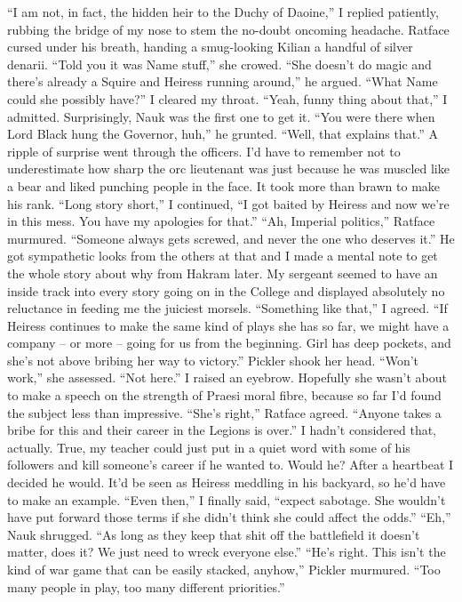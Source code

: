 \documentclass[12pt, openany]{book}
\begin{document}
“I am not, in fact, the hidden heir to the Duchy of Daoine,” I replied patiently, rubbing the bridge of my nose to stem the no-doubt oncoming headache.
Ratface cursed under his breath, handing a smug-looking Kilian a handful of silver denarii.
“Told you it was Name stuff,” she crowed.
“She doesn’t do magic and there’s already a Squire and Heiress running around,” he argued. “What Name could she possibly have?”
I cleared my throat.
“Yeah, funny thing about that,” I admitted.
Surprisingly, Nauk was the first one to get it.
“You were there when Lord Black hung the Governor, huh,” he grunted. “Well, that explains that.”
A ripple of surprise went through the officers. I’d have to remember not to underestimate how sharp the orc lieutenant was just because he was muscled like a bear and liked punching people in the face. It took more than brawn to make his rank.
“Long story short,” I continued, “I got baited by Heiress and now we’re in this mess. You have my apologies for that.”
“Ah, Imperial politics,” Ratface murmured. “Someone always gets screwed, and never the one who deserves it.”
He got sympathetic looks from the others at that and I made a mental note to get the whole story about why from Hakram later. My sergeant seemed to have an inside track into every story going on in the College and displayed absolutely no reluctance in feeding me the juiciest morsels.
“Something like that,” I agreed. “If Heiress continues to make the same kind of plays she has so far, we might have a company – or more – going for us from the beginning. Girl has deep pockets, and she’s not above bribing her way to victory.”
Pickler shook her head.
“Won’t work,” she assessed. “Not here.”
I raised an eyebrow. Hopefully she wasn’t about to make a speech on the strength of Praesi moral fibre, because so far I’d found the subject less than impressive.
“She’s right,” Ratface agreed. “Anyone takes a bribe for this and their career in the Legions is over.”
I hadn’t considered that, actually. True, my teacher could just put in a quiet word with some of his followers and kill someone’s career if he wanted to. Would he? After a heartbeat I decided he would. It’d be seen as Heiress meddling in his backyard, so he’d have to make an example.
“Even then,” I finally said, “expect sabotage. She wouldn’t have put forward those terms if she didn’t think she could affect the odds.”
“Eh,” Nauk shrugged. “As long as they keep that shit off the battlefield it doesn’t matter, does it? We just need to wreck everyone else.”
“He’s right. This isn’t the kind of war game that can be easily stacked, anyhow,” Pickler murmured. “Too many people in play, too many different priorities.”
\end{document}
